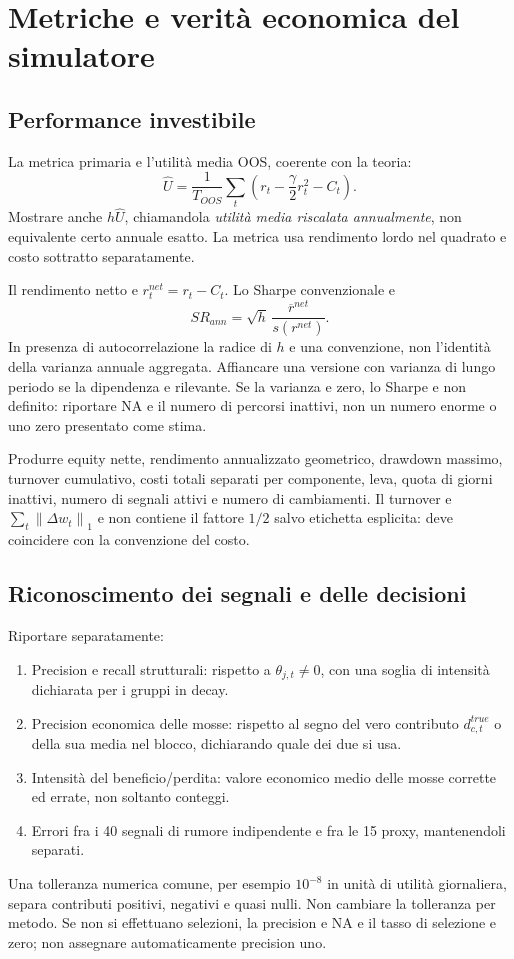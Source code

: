 \documentclass[11pt,a4paper]{article}
\theoremstyle{definition}\newtheorem{definition}[theorem]{Definizione}
\theoremstyle{remark}\newtheorem{remark}[theorem]{Osservazione}
\newcommand{\norm}[1]{\left\lVert#1\right\rVert}\newcommand{\abs}[1]{\left|#1\right|}
\begin{document}
\section{Metriche e verità economica del simulatore}
\label{sec:metrics}
\subsection{Performance investibile}
La metrica primaria e l'utilità media OOS, coerente con la teoria:
\begin{equation}
 \widehat U=\frac1{T_{OOS}}\sum_t
 \left(r_t-\frac\gamma2r_t^2-C_t\right).
\end{equation}
Mostrare anche $h\widehat U$, chiamandola \emph{utilità media riscalata annualmente}, non equivalente certo annuale esatto. La metrica usa rendimento lordo nel quadrato e costo sottratto separatamente.

Il rendimento netto e $r_t^{net}=r_t-C_t$. Lo Sharpe convenzionale e
\begin{equation}
 SR_{ann}=\sqrt h\,\frac{\overline r^{net}}{s(r^{net})}.
\end{equation}
In presenza di autocorrelazione la radice di $h$ e una convenzione, non l'identità della varianza annuale aggregata. Affiancare una versione con varianza di lungo periodo se la dipendenza e rilevante. Se la varianza e zero, lo Sharpe e non definito: riportare NA e il numero di percorsi inattivi, non un numero enorme o uno zero presentato come stima.

Produrre equity nette, rendimento annualizzato geometrico, drawdown massimo, turnover cumulativo, costi totali separati per componente, leva, quota di giorni inattivi, numero di segnali attivi e numero di cambiamenti. Il turnover e $\sum_t\norm{\Delta w_t}_1$ e non contiene il fattore $1/2$ salvo etichetta esplicita: deve coincidere con la convenzione del costo.

\subsection{Riconoscimento dei segnali e delle decisioni}
Riportare separatamente:
\begin{enumerate}
\item Precision e recall strutturali: rispetto a $\theta_{j,t}\ne0$, con una soglia di intensità dichiarata per i gruppi in decay.
\item Precision economica delle mosse: rispetto al segno del vero contributo $d^{true}_{c,t}$ o della sua media nel blocco, dichiarando quale dei due si usa.
\item Intensità del beneficio/perdita: valore economico medio delle mosse corrette ed errate, non soltanto conteggi.
\item Errori fra i 40 segnali di rumore indipendente e fra le 15 proxy, mantenendoli separati.
\end{enumerate}
Una tolleranza numerica comune, per esempio $10^{-8}$ in unità di utilità giornaliera, separa contributi positivi, negativi e quasi nulli. Non cambiare la tolleranza per metodo. Se non si effettuano selezioni, la precision e NA e il tasso di selezione e zero; non assegnare automaticamente precision uno.
\end{document}
